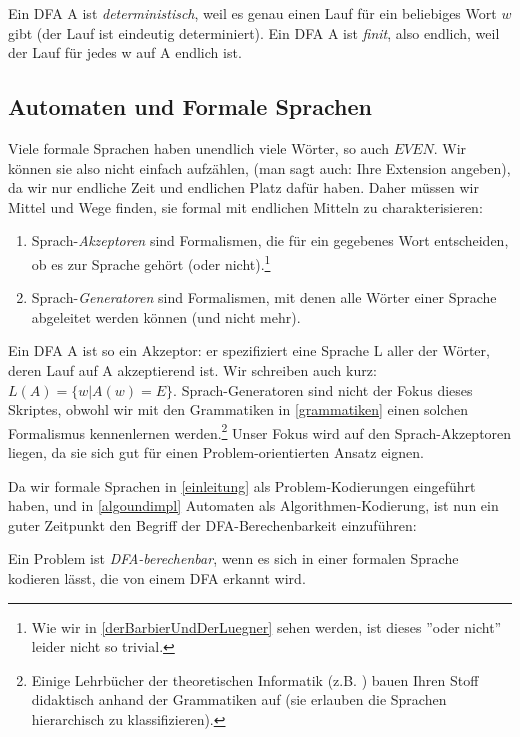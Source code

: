 Ein DFA A ist \emph{deterministisch}, weil es genau einen Lauf
für ein beliebiges Wort $w$ gibt (der Lauf ist eindeutig determiniert).
Ein DFA A ist \emph{finit}, also endlich, weil der Lauf für jedes w auf A endlich ist.

\subsection{Automaten und Formale Sprachen}

Viele formale Sprachen haben unendlich viele Wörter,
so auch $EVEN$.
Wir können sie also nicht einfach aufzählen,
(man sagt auch: Ihre Extension angeben),
da wir nur endliche Zeit und endlichen Platz dafür haben.
Daher müssen wir Mittel und Wege finden,
sie formal mit endlichen Mitteln zu charakterisieren:
\begin{enumerate}
    \item Sprach-\emph{Akzeptoren} sind Formalismen,
        die für ein gegebenes Wort entscheiden,
        ob es zur Sprache gehört (oder nicht).\footnote{
            Wie wir in \autoref{derBarbierUndDerLuegner} sehen werden,
            ist dieses ''oder nicht'' leider nicht so trivial.}

    \item Sprach-\emph{Generatoren} sind Formalismen,
        mit denen alle Wörter einer Sprache abgeleitet werden können
        (und nicht mehr).
\end{enumerate}


Ein DFA A ist so ein Akzeptor:
er spezifiziert eine Sprache L aller der Wörter,
deren Lauf auf A akzeptierend ist.
Wir schreiben auch kurz: $L(A) = \{w|A(w) = E\}$.
Sprach-Generatoren sind nicht der Fokus dieses Skriptes, obwohl wir mit den Grammatiken
in \autoref{grammatiken} einen solchen Formalismus kennenlernen werden.\footnote{
Einige Lehrbücher der theoretischen Informatik 
(z.B. \cite{schoening})
bauen Ihren Stoff didaktisch anhand der Grammatiken
auf (sie erlauben die Sprachen hierarchisch zu klassifizieren).}
Unser Fokus wird auf den Sprach-Akzeptoren liegen,
da sie sich gut für einen Problem-orientierten Ansatz eignen.

Da wir formale Sprachen in \autoref{einleitung} als Problem-Kodierungen eingeführt haben,
und in \autoref{algoundimpl} Automaten als Algorithmen-Kodierung,
ist nun ein guter Zeitpunkt den Begriff der DFA-Berechenbarkeit einzuführen:

Ein Problem ist \emph{DFA-berechenbar},
wenn es sich in einer formalen Sprache kodieren lässt,
die von einem DFA erkannt wird.

